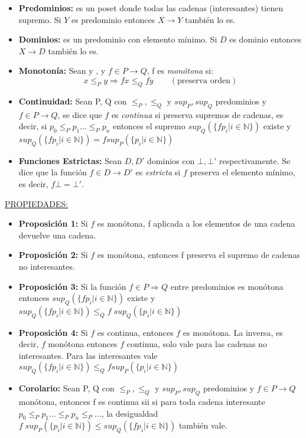 \begin{itemize}
\begin{itemize}
    \end{itemize}
  \item \textbf{Predominios:} es un poset donde todas las cadenas (interesantes) tienen supremo.
    \PN Si $Y$ es predominio entonces $X \rightarrow Y$ también lo es.
  \item \textbf{Dominios:} es un predominio con elemento mínimo.
  \PN Si $D$ es dominio entonces $X \rightarrow D$ también lo es.
  \item \textbf{Monotonía:} Sean  y , y $f \in P \rightarrow Q$, f es \textit{monótona} si:
    \[
      x \leq_P y \Rightarrow f x \leq_Q f y \qquad (\text{preserva orden})
    \]
  \item \textbf{Continuidad:} Sean P, Q con $\leq_P, \leq_Q$ y $sup_P, sup_Q$ predominios y $f \in P \rightarrow Q$, se dice que $f$ es \textit{continua} si preserva supremos de cadenas, es decir, si $p_0 \leq_P p_1 \dotsc \leq_P p_n$ entonces el supremo $sup_Q(\{f p_i | i \in \mathbb{N}\})$ existe y $sup_Q(\{f p_i | i \in \mathbb{N}\}) = f sup_P(\{p_i | i \in \mathbb{N}\})$
  \item \textbf{Funciones Estrictas:} Sean $D, D'$ dominios con $\bot, \bot'$ respectivamente. Se dice que la función $f \in D \rightarrow D'$ es \textit{estricta} si $f$ preserva el elemento mínimo, es decir, $f \bot = \bot'$.
\end{itemize}

\PN \underline{PROPIEDADES:}
  \begin{itemize}
    \item \textbf{Proposición 1:} Si $f$ es monótona, f aplicada a los elementos de una cadena devuelve una cadena.
    \item \textbf{Proposición 2:} Si $f$ es monótona, entonces f preserva el supremo de cadenas no interesantes.
    \item \textbf{Proposición 3:} Si la función $f \in P \Rightarrow Q$ entre predominios es monótona entonces $sup_Q(\{f p_i | i \in \mathbb{N}\})$ existe y $sup_Q(\{f p_i | i \in \mathbb{N}\}) \leq_Q f \; sup_Q(\{p_i | i \in \mathbb{N}\})$
    \item \textbf{Proposición 4:} Si $f$ es continua, entonces $f$ es monótona.
      \PN La inversa, es decir, $f$ monótona entonces $f$ continua, solo vale para las cadenas no interesantes. Para las interesantes vale $sup_Q(\{f p_i | i \in \mathbb{N}\}) \leq_Q f sup_P(\{p_i | i \in \mathbb{N}\})$
    \item \textbf{Corolario:} Sean P, Q con $\leq_P, \leq_Q$ y $sup_P, sup_Q$ predominios y $f \in P \rightarrow Q$ monótona, entonces f es continua sii si para toda cadena interesante $p_0 \leq_P p_1 \dotsc \leq_P p_n \leq_P \dotsc$, la desigualdad $f \; sup_P(\{p_i | i \in \mathbb{N}\}) \leq sup_Q(\{f p_i | i \in \mathbb{N}\})$ también vale.
  \end{itemize}

